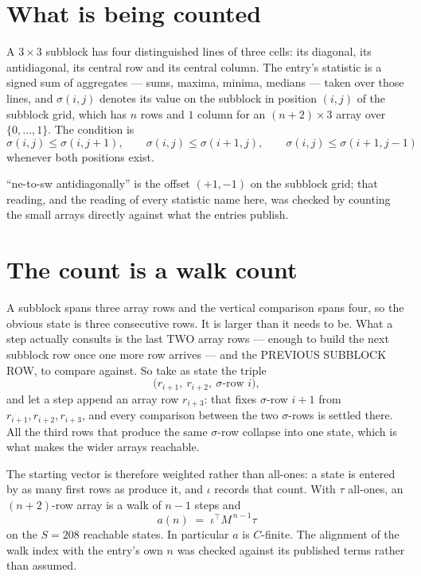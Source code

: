 \documentclass[11pt,a4paper]{article}
\theoremstyle{plain}
\theoremstyle{definition}
\begin{document}
\section{What is being counted}

A $3\times3$ subblock has four distinguished lines of three cells: its diagonal, its
antidiagonal, its central row and its central column. The entry's statistic is a signed sum of
aggregates --- sums, maxima, minima, medians --- taken over those lines, and $\sigma(i,j)$
denotes its value on the subblock in position $(i,j)$ of the subblock grid, which has $n$ rows
and $1$ column for an $(n+2)\times3$ array over $\{0,\dots,1\}$. The condition is
\[
\sigma(i,j)\le\sigma(i,j+1),\qquad \sigma(i,j)\le\sigma(i+1,j),\qquad \sigma(i,j)\le\sigma(i+1,j-1)
\]
whenever both positions exist.

``ne-to-sw antidiagonally'' is the offset $(+1,-1)$ on the subblock grid; that reading, and
the reading of every statistic name here, was checked by counting the small arrays directly
against what the entries publish.

\section{The count is a walk count}

A subblock spans three array rows and the vertical comparison spans four, so the obvious state
is three consecutive rows. It is larger than it needs to be. What a step actually consults is
the last TWO array rows --- enough to build the next subblock row once one more row arrives ---
and the PREVIOUS SUBBLOCK ROW, to compare against. So take as state the triple
\[
\bigl(r_{i+1},\ r_{i+2},\ \sigma\text{-row }i\bigr),
\]
and let a step append an array row $r_{i+3}$: that fixes $\sigma$-row $i+1$ from
$r_{i+1},r_{i+2},r_{i+3}$, and every comparison between the two $\sigma$-rows is settled
there. All the third rows that produce the same $\sigma$-row collapse into one state, which is
what makes the wider arrays reachable.

The starting vector is therefore weighted rather than all-ones: a state is entered by as many
first rows as produce it, and $\iota$ records that count. With $\tau$ all-ones, an
$(n+2)$-row array is a walk of $n-1$ steps and
\[
a(n)\;=\;\iota^{\!\top}M^{\,n-1}\tau
\]
on the $S=208$ reachable states. In particular $a$ is $C$-finite. The alignment of the walk
index with the entry's own $n$ was checked against its published terms rather than assumed.
\end{document}

